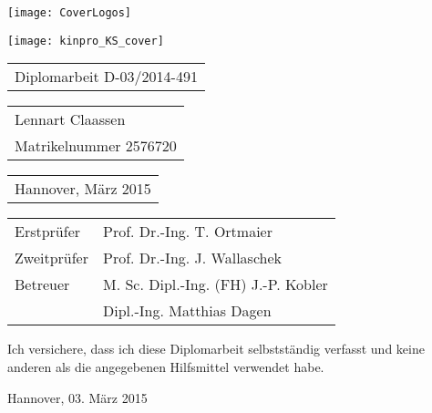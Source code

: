 \begin{titlepage}
\begin{spacing}{2}

\begin{flushright} %
	\vspace*{-20mm}
	\texttt{[image: CoverLogos]}
\end{flushright} %

\vspace{38mm} {

\vfill
\vspace{3mm}
\texttt{[image: kinpro\_KS\_cover]}

\vfill }
\end{spacing}
\begin{spacing}{1}
\begin{tabular}{l}
 \Large{Diplomarbeit D-03/2014-491}
\end{tabular}

\vspace{5mm}

\begin{tabular}{l}
\large{Lennart Claassen}\\
\large{Matrikelnummer 2576720}
\end{tabular}

\vspace{5mm}

\begin{tabular}{l}
\large{Hannover, März 2015}
\end{tabular}


\vspace{5mm}
{\large
\begin{tabular}{l l}
Erstprüfer  & Prof. Dr.-Ing. T. Ortmaier\\
Zweitprüfer & Prof. Dr.-Ing. J. Wallaschek\\
Betreuer    & M. Sc. Dipl.-Ing. (FH) J.-P. Kobler\\
& Dipl.-Ing. Matthias Dagen\\
\end{tabular}
}

\end{spacing}
\end{titlepage}





%


\noindent Ich versichere, dass ich diese Diplomarbeit selbstständig
verfasst und keine anderen als die angegebenen Hilfsmittel verwendet
habe.

\vspace{25mm}

\noindent Hannover, 03. März 2015
\newpage

